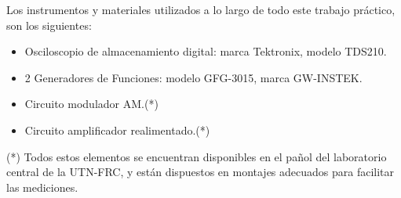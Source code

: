 
Los instrumentos y materiales utilizados a lo largo de todo este trabajo práctico, son los siguientes:

\begin{itemize}
    \item Osciloscopio de almacenamiento digital: 
    marca Tektronix, modelo TDS210.
    \item 2 Generadores de Funciones: modelo GFG-3015, marca GW-INSTEK.
    \item Circuito modulador AM.(*)
    \item Circuito amplificador realimentado.(*)
    
\end{itemize}

(*) Todos estos elementos se encuentran disponibles en el pañol del laboratorio central de la UTN-FRC, y
están dispuestos en montajes adecuados para facilitar las mediciones.
